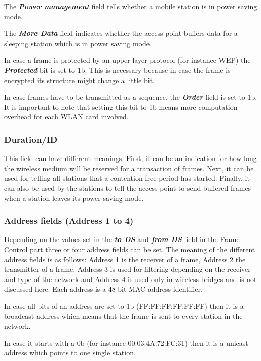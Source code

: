 The {\bf{\em Power management}} field tells whether a mobile station is in power saving mode.

The {\bf{\em More Data}} field indicates whether the access point buffers data for a sleeping station which is in power saving mode.

In case a frame is protected by an upper layer protocol (for instance WEP) the {\bf{\em Protected}} bit is set to 1b. This is necessary because in case the frame is encrypted its structure might change a little bit.

In case frames have to be transmitted as a sequence, the {\bf{\em Order}} field is set to 1b. It is important to note that setting this bit to 1b means more computation overhead for each WLAN card involved.

\subsubsection{Duration/ID}

This field can have different meanings. First, it can be an indication for how long the wireless medium will be reserved for a transaction of frames. Next, it can be used for telling all stations that a contention free period has started. Finally, it can also be used by the stations to tell the access point to send buffered frames when a station leaves its power saving mode.

\subsubsection{Address fields (Address 1 to 4)}

Depending on the values set in the {\bf{\em to DS}} and {\bf{\em from DS}} field in the Frame Control part three or four address fields can be set. The meaning of the different address fields is as follows: Address 1 is the receiver of a frame, Address 2 the transmitter of a frame, Address 3 is used for filtering depending on the receiver and type of the network and Address 4 is used only in wireless bridges and is not discussed here. Each address is a 48 bit MAC address identifier.

In case all bits of an address are set to 1b (FF:FF:FF:FF:FF:FF) then it is a broadcast address which means that the frame is sent to every station in the network.

In case it starts with a 0b (for instance 00:03:4A:72:FC:31) then it is a unicast address which points to one single station.

